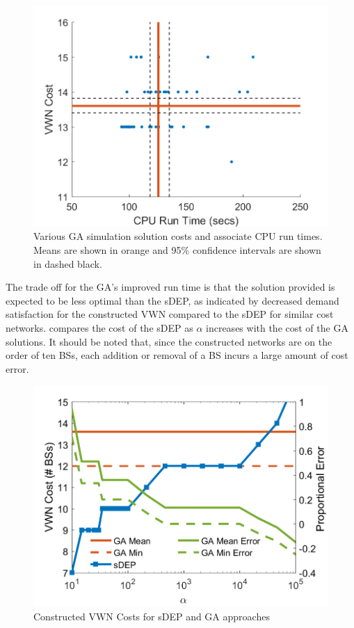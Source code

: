 \documentclass[12pt,dvipsnames]{report}
\begin{document}
\begin{figure}[htp]
	\centering
	\includegraphics[height=0.4\textheight]{Figures/Prelim_GARunTimesVCosts_cis}
	\caption[GA approach VWN cost and run time trend for the preliminary simulations]{Various GA simulation solution costs and associate CPU run times.  Means are shown in orange and 95\% confidence intervals are shown in dashed black.}
	\label{fig:Prelim_GARunTimesVCosts}
\end{figure}

The trade off for the GA's improved run time is that the solution provided is expected to be less optimal than the sDEP, as indicated by decreased demand satisfaction for the constructed VWN compared to the sDEP for similar cost networks.   compares the cost of the sDEP as $\alpha$ increases with the cost of the GA solutions.  It should be noted that, since the constructed networks are on the order of ten BSs, each addition or removal of a BS incurs a large amount of cost error.

\begin{figure}[htp]
	\centering
	\includegraphics[height=0.4\textheight]{Figures/Prelim_O25sDEPGACostComparison_Expanded2}
	\caption[Constructed VWN cost results for the preliminary simulations]{Constructed VWN Costs for sDEP and GA approaches}
	\label{fig:Prelim_VWNCompCost}
\end{figure}
\end{document}
